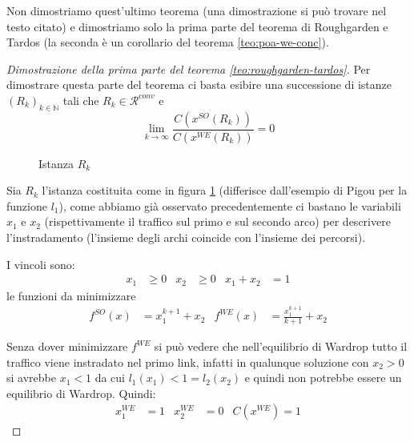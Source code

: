 \documentclass[a4paper]{article}
\theoremstyle{plain}
\theoremstyle{definition}
\theoremstyle{remark}
\newcommand{\pa}[1]{\left(#1\right)}
\begin{document}
Non dimostriamo quest'ultimo teorema (una dimostrazione si può
trovare nel testo citato) e dimostriamo solo la prima
parte del teorema di Roughgarden e Tardos (la seconda è un corollario
del teorema \ref{teo:poa-we-conc}).

\begin{proof}[Dimostrazione della prima parte del teorema \ref{teo:roughgarden-tardos}]
  Per dimostrare questa parte del teorema ci basta esibire una
  successione di istanze $\pa{R_k}_{k\in \mathbb{N}}$ tali che $R_k\in
  \mathcal{R}^{conv}$ e
  \[ \lim _{k\to \infty} \frac{C\pa{ x^{SO}\pa{R_k}}}{C\pa{
x^{WE}\pa{R_k}}} = 0 \]

  \begin{figure}[ht]
    \centering
    \caption{Istanza $R_k$}
    \label{fig:esempio-conv-poa}
  \end{figure}

  Sia $R_k$ l'istanza costituita come in figura
  \ref{fig:esempio-conv-poa} (differisce dall'esempio di Pigou per la
  funzione $l_1$), come abbiamo già osservato precedentemente ci
  bastano le variabili $x_1$ e $x_2$ (rispettivamente il traffico sul
  primo e sul secondo arco) per descrivere l'instradamento (l'insieme
  degli archi coincide con l'insieme dei percorsi).
  
  I vincoli sono:
  \begin{align*}
    x_1 &\ge 0 & x_2 &\ge 0 & x_1 + x_2 &= 1
  \end{align*}
  le funzioni da minimizzare
  \begin{align*}
    f^{SO}(x) &= x_1^{k+1} + x_2 & f^{WE}(x) &= \frac{x_1^{k+1}}{k+1}
                                              + x_2
  \end{align*}
  
  Senza dover minimizzare $f^{WE}$ si può vedere che nell'equilibrio
  di Wardrop tutto il traffico viene instradato nel primo link,
  infatti in qualunque soluzione con $x_2>0$ si avrebbe $x_1<1$ da cui
  $l_1(x_1) < 1 = l_2(x_2)$ e quindi non potrebbe essere un equilibrio
  di Wardrop. Quindi:
  \begin{align*}
    x^{WE}_1 &= 1 & x^{WE}_2 &= 0 & C\pa{x^{WE}} = 1
  \end{align*}


\end{proof}
\end{document}

